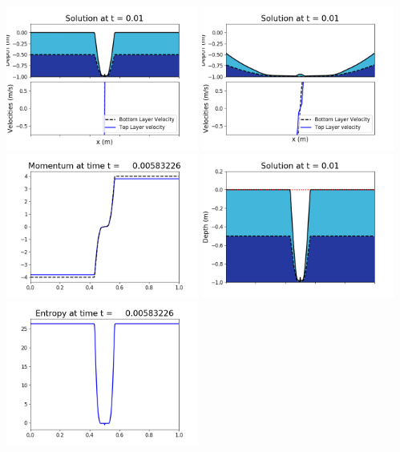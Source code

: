 \documentclass[11pt]{article}
\begin{document}
\vskip 10pt 
\includegraphics[width=0.475\textwidth]{frame0037fig1001.png}
\includegraphics[width=0.475\textwidth]{frame0037fig1002.png}
\vskip 10pt 
\includegraphics[width=0.475\textwidth]{frame0037fig1003.png}
\includegraphics[width=0.475\textwidth]{frame0037fig1006.png}
\vskip 10pt 
\includegraphics[width=0.475\textwidth]{frame0037fig1007.png}
\end{document}
